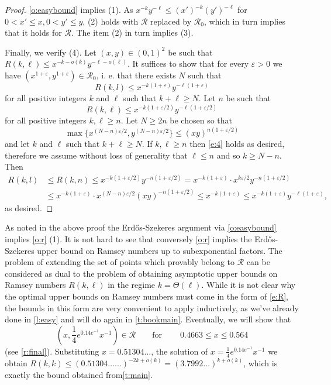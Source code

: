 \documentclass[reqno,final,12pt]{amsart}
\newcommand{\eps}{\varepsilon}
\newcommand{\mc}[1]{\mathcal{#1}}
\begin{document}
\begin{proof}
\cref{o:easybound} implies (1). As $ x^{-k}y^{-\ell} \leq (x')^{-k}(y')^{-\ell}$ for $0 < x' \leq x, 0 < y' \leq y$,  (2) holds with $\mc{R}$ replaced by $\mc{R}_0$, which in turn implies  that it holds for  $\mc{R}$.  The item (2) in turn implies (3). 

Finally, we verify (4). Let $(x,y) \in (0,1)^2$ be such that $R(k,\ell) \leq x^{-k-o(k)}y^{-\ell-o(\ell)}$. It suffices to show that for every $ \eps > 0$ we have $(x^{1+\eps},y^{1+\eps}) \in \mc{R}_0$, i. e. that there exists $N$ such that \begin{equation}\label{e:4}R(k,l) \leq x^{-k(1+\eps)}y^{-\ell(1+\eps)}\end{equation} for all positive integers $k$ and $\ell$ such that $k + \ell \geq N$. Let $n$ be such that $$R(k,\ell) \leq x^{-k(1+\eps/2)} y^{-\ell(1+\eps/2)}$$ for all positive integers $k,\ell \geq n$.
Let $N \geq 2n$ be chosen so that $$\max\{x^{(N-n)\eps/2},y^{(N-n)\eps/2}\} \leq (xy)^{n(1+\eps/2)}$$ and let  $k$ and $\ell$ such that $k + \ell \geq N$. If $k, \ell \geq n$ then \eqref{e:4} holds as desired, therefore we assume without loss of generality that $\ell \leq n$ and so $k \geq N-n$. Then \begin{align*} 
R(k,l) &\leq R(k,n) \leq x^{-k(1+\eps/2)}y^{-n(1+\eps/2)} = x^{-k(1+\eps)} \cdot x^{k\eps/2}y^{-n(1+\eps/2)} \\& \leq x^{-k(1+\eps)}   \cdot x^{(N-n)\eps/2}(xy)^{-n(1+\eps/2)} \leq x^{-k(1+\eps)} \leq  x^{-k(1+\eps)}y^{-\ell(1+\eps)},
\end{align*}
as desired.
\end{proof} 

As noted in the above proof the Erd\H{o}s-Szekeres argument via \cref{o:easybound} implies \cref{o:r} (1). It is not hard to see that conversely \cref{o:r} implies the Erd\H{o}s-Szekeres upper bound on Ramsey numbers up to subexponential factors. The problem of extending the set of points which provably belong to $\mc{R}$ can be considered as  dual to the problem of obtaining asymptotic upper bounds on Ramsey numbers $R(k, \ell)$ in the regime $k = \Theta(\ell)$. While it is not clear why the optimal upper bounds on Ramsey numbers must come in the form of \eqref{e:R}, the bounds in this form are very convenient to apply inductively, as we've already done in \cref{l:easy} and will do again in \cref{t:bookmain}.
Eventually, we will show that \begin{equation}\label{e:R2} (x,\frac{1}{4}e^{ 0.14e^{-1}}x^{-1}) \in \mc{R} \qquad \mathrm{for\: } \qquad 0.4663 \leq x  \leq 0.564\end{equation} (see \cref{r:final}). Substituting $x=0.51304\ldots$, the solution of $x = \frac{1}{4}e^{0.14e^{-1}}x^{-1}$  we obtain $R(k,k) \leq (0.51304\ldots...)^{-2k+o(k)} = (3.7992\ldots)^{k+o(k)}$, which is exactly the bound obtained from\cref{t:main}.
\end{document}

